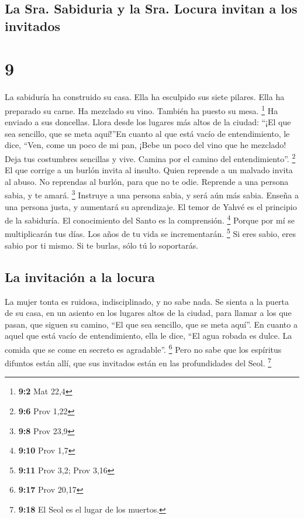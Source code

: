 \hypertarget{la-sra.-sabiduria-y-la-sra.-locura-invitan-a-los-invitados}{%
\subsection{La Sra. Sabiduria y la Sra. Locura invitan a los
invitados}\label{la-sra.-sabiduria-y-la-sra.-locura-invitan-a-los-invitados}}

\hypertarget{section-8}{%
\section{9}\label{section-8}}

 La sabiduría ha construido su casa. Ella ha esculpido sus
siete pilares.  Ella ha preparado su carne. Ha mezclado su
vino. También ha puesto su mesa. \footnote{\textbf{9:2} Mat 22,4}
 Ha enviado a sus doncellas. Llora desde los lugares más
altos de la ciudad:  ``¡El que sea sencillo, que se meta
aquí!''En cuanto al que está vacío de entendimiento, le dice,
 ``Ven, come un poco de mi pan, ¡Bebe un poco del vino que
he mezclado!  Deja tus costumbres sencillas y vive. Camina
por el camino del entendimiento''. \footnote{\textbf{9:6} Prov 1,22}
 El que corrige a un burlón invita al insulto. Quien
reprende a un malvado invita al abuso.  No reprendas al
burlón, para que no te odie. Reprende a una persona sabia, y te amará.
\footnote{\textbf{9:8} Prov 23,9}  Instruye a una persona
sabia, y será aún más sabia. Enseña a una persona justa, y aumentará su
aprendizaje.  El temor de Yahvé es el principio de la
sabiduría. El conocimiento del Santo es la comprensión. \footnote{\textbf{9:10}
  Prov 1,7}  Porque por mí se multiplicarán tus días. Los
años de tu vida se incrementarán. \footnote{\textbf{9:11} Prov 3,2; Prov
  3,16}  Si eres sabio, eres sabio por ti mismo. Si te
burlas, sólo tú lo soportarás.

\hypertarget{la-invitaciuxf3n-a-la-locura}{%
\subsection{La invitación a la
locura}\label{la-invitaciuxf3n-a-la-locura}}

 La mujer tonta es ruidosa, indisciplinado, y no sabe
nada.  Se sienta a la puerta de su casa, en un asiento en
los lugares altos de la ciudad,  para llamar a los que
pasan, que siguen su camino,  ``El que sea sencillo, que
se meta aquí''. En cuanto a aquel que está vacío de entendimiento, ella
le dice,  ``El agua robada es dulce. La comida que se
come en secreto es agradable''. \footnote{\textbf{9:17} Prov 20,17}
 Pero no sabe que los espíritus difuntos están allí, que
sus invitados están en las profundidades del Seol. \footnote{\textbf{9:18}
  El Seol es el lugar de los muertos.}

